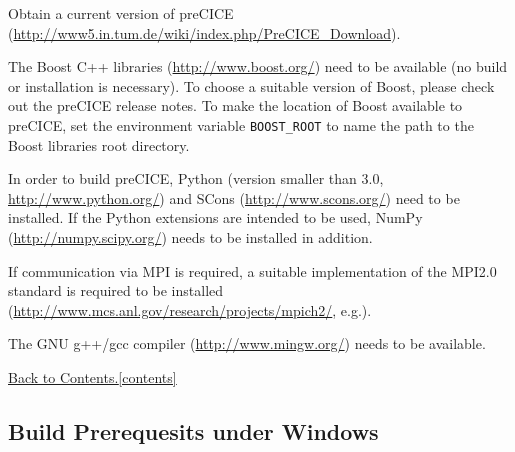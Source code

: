 \documentclass[11pt, oneside]{scrartcl}
\newcommand{\backtocontents}{\hyperref[contents]{Back to Contents.\ref*{contents}}}
\begin{document}
\begin{itemize*} 
\item Obtain a current version of preCICE (\url{http://www5.in.tum.de/wiki/index.php/PreCICE_Download}).

\item The Boost C++ libraries (\url{http://www.boost.org/}) need to be available (no build or installation is necessary). To choose a suitable version of Boost, please check out the preCICE release notes. To make the location of Boost available to preCICE, set the environment variable \texttt{BOOST\_ROOT} to name the path to the Boost libraries root directory.

\item In order to build preCICE, Python (version smaller than 3.0, \url{http://www.python.org/}) and SCons (\url{http://www.scons.org/}) need to be installed. If the Python extensions are intended to be used, NumPy (\url{http://numpy.scipy.org/}) needs to be installed in addition.

\item If communication via MPI is required, a suitable  implementation of the MPI2.0 standard is required to be installed
(\url{http://www.mcs.anl.gov/research/projects/mpich2/}, e.g.).

\item The GNU g++/gcc compiler (\url{http://www.mingw.org/}) needs to be available.
\end{itemize*}

\backtocontents

\subsection{Build Prerequesits under Windows}
\end{document}
